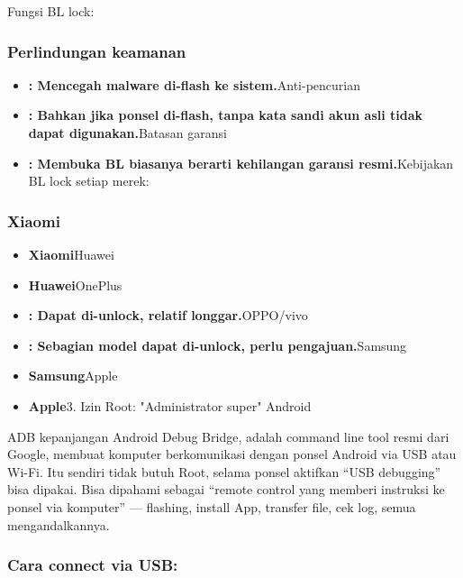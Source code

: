 
Fungsi BL lock:

\subsubsection*{Perlindungan keamanan}

\begin{itemize}
  \item \textbf{: Mencegah malware di-flash ke sistem.}Anti-pencurian
  \item \textbf{: Bahkan jika ponsel di-flash, tanpa kata sandi akun asli tidak dapat digunakan.}Batasan garansi
  \item \textbf{: Membuka BL biasanya berarti kehilangan garansi resmi.}Kebijakan BL lock setiap merek:
\end{itemize}

\subsubsection*{Xiaomi}

\begin{itemize}
  \item \textbf{Xiaomi}Huawei
  \item \textbf{Huawei}OnePlus
  \item \textbf{: Dapat di-unlock, relatif longgar.}OPPO/vivo
  \item \textbf{: Sebagian model dapat di-unlock, perlu pengajuan.}Samsung
  \item \textbf{Samsung}Apple
  \item \textbf{Apple}3. Izin Root: "Administrator super" Android
\end{itemize}


ADB kepanjangan Android Debug Bridge, adalah command line tool resmi dari Google, membuat komputer berkomunikasi dengan ponsel Android via USB atau Wi-Fi. Itu sendiri tidak butuh Root, selama ponsel aktifkan “USB debugging” bisa dipakai. Bisa dipahami sebagai “remote control yang memberi instruksi ke ponsel via komputer” — flashing, install App, transfer file, cek log, semua mengandalkannya.

\subsubsection*{Cara connect via USB:}

